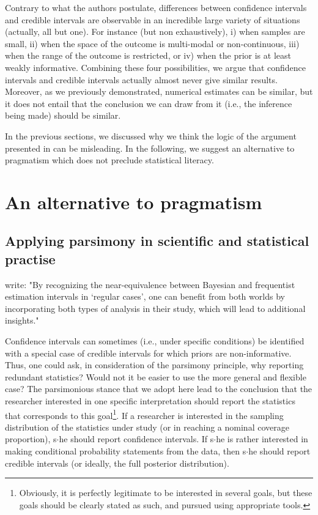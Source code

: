 \documentclass[a4paper,man,natbib,floatsintext,donotrepeattitle]{apa6}
\begin{document}
Contrary to what the authors postulate, differences between confidence intervals and credible intervals are observable in an incredible large variety of situations (actually, all but one). For instance (but non exhaustively), i) when samples are small, ii) when the space of the outcome is multi-modal or non-continuous, iii) when the range of the outcome is restricted, or iv) when the prior is at least weakly informative. Combining these four possibilities, we argue that confidence intervals and credible intervals actually almost never give similar results. Moreover, as we previously demonstrated, numerical estimates can be similar, but it does not entail that the conclusion we can draw from it (i.e., the inference being made) should be similar.

In the previous sections, we discussed why we think the logic of the argument presented in \cite{albers_credible_2018} can be misleading. In the following, we suggest an alternative to pragmatism which does not preclude statistical literacy.

\section{An alternative to pragmatism}

\subsection{Applying parsimony in scientific and statistical practise}

\cite{albers_credible_2018} write: "By recognizing the near-equivalence between Bayesian and frequentist estimation intervals in ‘regular cases’, one can benefit from both worlds by incorporating both types of analysis in their study, which will lead to additional insights."

Confidence intervals can sometimes (i.e., under specific conditions) be identified with a special case of credible intervals for which priors are non-informative. Thus, one could ask, in consideration of the parsimony principle, why reporting redundant statistics? Would not it be easier to use the more general and flexible case? The parsimonious stance that we adopt here lead to the conclusion that the researcher interested in one specific interpretation should report the statistics that corresponds to this goal\footnote{Obviously, it is perfectly legitimate to be interested in several goals, but these goals should be clearly stated as such, and pursued using appropriate tools.}. If a researcher is interested in the sampling distribution of the statistics under study (or in reaching a nominal coverage proportion), s$\cdot$he should report confidence intervals. If s$\cdot$he is rather interested in making conditional probability statements from the data, then s$\cdot$he should report credible intervals (or ideally, the full posterior distribution).
\end{document}
